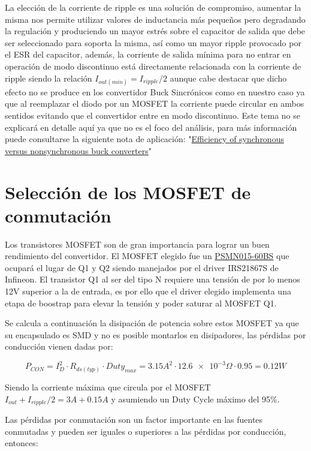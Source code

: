 \documentclass[12pt]{report}
\begin{document}
	La elección de la corriente de ripple es una solución de compromiso, aumentar la misma nos permite utilizar valores de inductancia más pequeños pero degradando la regulación y produciendo un mayor estrés sobre el capacitor de salida que debe ser seleccionado para soporta la misma, así como un mayor ripple provocado por el ESR del capacitor, además, la corriente de salida mínima para no entrar en operación de modo discontinuo está directamente relacionada con la corriente de ripple siendo la relación $I_{out(min)} = I_{ripple}/2$ aunque cabe destacar que dicho efecto no se produce en los convertidor Buck Sincrónicos como en nuestro caso ya que al reemplazar el diodo por un MOSFET la corriente puede circular en ambos sentidos evitando que el convertidor entre en modo discontinuo. Este tema no se explicará en detalle aquí ya que no es el foco del análisis, para más información puede consultarse la siguiente nota de aplicación: "\href{http://www.ti.com/lit/an/slyt358/slyt358.pdf}{Efficiency of synchronous versus
		nonsynchronous buck converters}"
	
\section{Selección de los MOSFET de conmutación}
	
	Los transistores MOSFET son de gran importancia para lograr un buen rendimiento del convertidor. El MOSFET elegido fue un \href{https://assets.nexperia.com/documents/data-sheet/PSMN015-60BS.pdf}{PSMN015-60BS} que ocupará el lugar de Q1 y Q2 siendo manejados por el driver IRS21867S de Infineon. El transistor Q1 al ser del tipo N requiere una tensión de por lo menos 12V superior a la de entrada, es por ello que el driver elegido implementa una etapa de boostrap para elevar la tensión y poder saturar al MOSFET Q1.
	
	Se calcula a continuación la disipación de potencia sobre estos MOSFET ya que su encapsulado es SMD y no es posible montarlos en disipadores, las pérdidas por conducción vienen dadas por:
	
	\begin{equation}
	P_{CON} = I_D^2 \cdot R_{ds(typ)} \cdot Duty_{max} =  3.15A^2 \cdot \num{12.6e-3}\Omega \cdot 0.95 = 0.12W
	\end{equation}
	
	Siendo la corriente máxima que circula por el MOSFET $I_{out} + I_{ripple}/2 = 3A + 0.15A$ y asumiendo un Duty Cycle máximo del 95\%.
	
	Las pérdidas por conmutación son un factor importante en las fuentes conmutadas y pueden ser iguales o superiores a las pérdidas por conducción, entonces:
	
\end{document}
